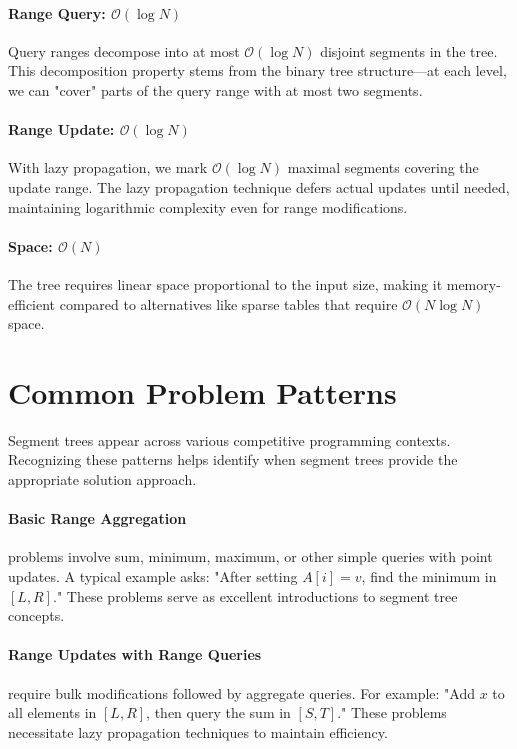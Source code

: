 \paragraph{Range Query: $\mathcal{O}(\log N)$} Query ranges decompose into at most $\mathcal{O}(\log N)$ disjoint segments in the tree. This decomposition property stems from the binary tree structure—at each level, we can "cover" parts of the query range with at most two segments.

\paragraph{Range Update: $\mathcal{O}(\log N)$} With lazy propagation, we mark $\mathcal{O}(\log N)$ maximal segments covering the update range. The lazy propagation technique defers actual updates until needed, maintaining logarithmic complexity even for range modifications.

\paragraph{Space: $\mathcal{O}(N)$} The tree requires linear space proportional to the input size, making it memory-efficient compared to alternatives like sparse tables that require $\mathcal{O}(N \log N)$ space.

\section{Common Problem Patterns}
\label{sec:typical_tasks}

Segment trees appear across various competitive programming contexts. Recognizing these patterns helps identify when segment trees provide the appropriate solution approach.

\paragraph{Basic Range Aggregation} problems involve sum, minimum, maximum, or other simple queries with point updates. A typical example asks: "After setting $A[i] = v$, find the minimum in $[L,R]$." These problems serve as excellent introductions to segment tree concepts.

\paragraph{Range Updates with Range Queries} require bulk modifications followed by aggregate queries. For example: "Add $x$ to all elements in $[L,R]$, then query the sum in $[S,T]$." These problems necessitate lazy propagation techniques to maintain efficiency.

